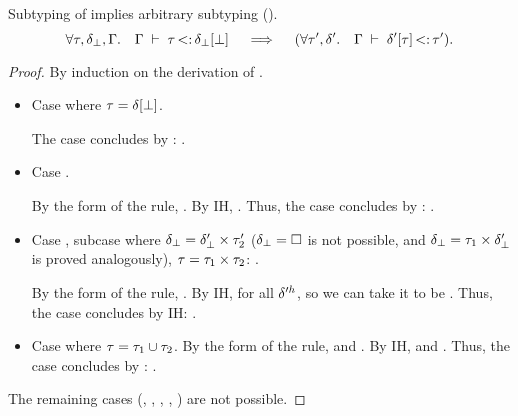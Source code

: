 \begin{lemma}{Subtyping of \tybot implies arbitrary subtyping
    (\textbf{}).}\label{lem:sub-of-bot:app}
    \[
    \forall \tau, \delta_{\bot}, \Gamma.\quad 
    \Gamma\;\vdash\;\tau \operatorname{<:} \delta_{\bot}[\bot]
    \quad\implies\quad
    (\forall \tau', \delta'.\quad \Gamma\;\vdash\;\delta'[\tau] \operatorname{<:} \tau').
    \]
\end{lemma}
\begin{proof}
    By induction on the derivation of 
    \subtydflt{\ty}{\plug{\dctx_{\tybot}}\tybot}.
    \begin{itemize}
        \item Case 
            \subtydflt{\plug\dctx\tybot}{\plug{\dctx_{\tybot}}{\tybot}}
            where $\tau = \delta[\bot]$.

            The case concludes by :
            . 
        \item Case 
            \subtydflt{\plug\dctx\vany}{\plug{\dctx_{\tybot}}{\tybot}}.

            By the form of the rule, \subtydflt{\plug\dctx\tyub}{\plug{\dctx_{\tybot}}{\tybot}}.
            By IH, .
            Thus, the case concludes by : 
            .
        \item Case , subcase where
            $\delta_{\bot} = \delta'_{\bot} \times \tau'_2$
            ($\delta_{\bot} = \square$ is not possible, and
            $\delta_{\bot} = \tau_1 \times \delta'_{\bot}$
            is proved analogously),
            $\tau = \tau_1 \times \tau_2$:
            {}.

            By the form of the rule, .
            By IH,  for all $\delta'^h$,
            so we can take it to be .
            Thus, the case concludes by IH: 
            .
        \item Case 
            where $\tau = \tau_1 \cup \tau_2$.
            By the form of the rule, 
             and
            .
            By IH,  and
            .
            Thus, the case concludes by : 
            .
    \end{itemize}
    The remaining cases 
    (, , , , ) 
    are not possible.
\end{proof}

